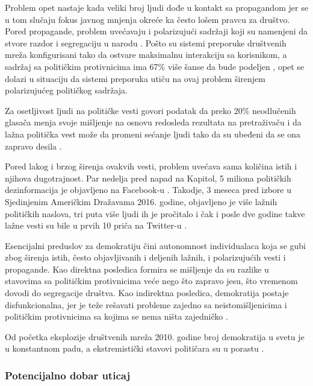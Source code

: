 \documentclass[a4paper]{article}
\begin{document}
Problem opet nastaje kada veliki broj ljudi dođe u kontakt sa propagandom jer se u tom slučaju fokus javnog mnjenja okreće ka često lošem pravcu za društvo. Pored propagande, problem uvećavaju i polarizujući sadržaji koji su namenjeni da stvore razdor i segregaciju u narodu \cite{Ledger_of_Harms}. Pošto su sistemi preporuke društvenih mreža konfigurisani tako da ostvare maksimalnu interakciju sa korisnikom, a sadržaj sa političkim protivnicima ima 67\% više šanse da bude podeljen \cite{Rathje_Van_Bavel_van_der_Linden_2021}, opet se dolazi u situaciju da sistemi preporuka utiču na ovaj problem širenjem polarizujućeg političkog sadržaja.

Za osetljivost ljudi na političke vesti govori podatak da preko 20\% neodlučenih glasača menja svoje mišljenje na osnovu redosleda rezultata na pretraživaču \cite{Epstein_Robertson_2015} i da lažna politička vest može da promeni sećanje ljudi tako da su ubeđeni da se ona zapravo desila \cite{Murphy_Loftus_Grady_Levine_Greene_2019}.

Pored lakog i brzog širenja ovakvih vesti, problem uvećava sama količina istih i njihova dugotrajnost. Par nedelja pred napad na Kapitol, 5 miliona političkih dezinformacija je objavljeno na Facebook-u \cite{Mac_Silverman_2020}. Takodje, 3 meseca pred izbore u Sjedinjenim Američkim Dražavama 2016. godine, objavljeno je više lažnih političkih naslova, tri puta više ljudi ih je pročitalo i čak i posle dve godine takve lažne vesti su bile u prvih 10 priča na Twitter-u \cite{Silverman_2016} \cite{Knight_Foundation}.

Esencijalni preduslov za demokratiju čini autonomnost individualaca \cite{Genovesi_Kaesling_Robbins_2023} koja se gubi zbog širenja istih, često objavljivanih i deljenih lažnih, i polarizujućih vesti i propagande. Kao direktna posledica formira se mišljenje da su razlike u stavovima sa političkim protivnicima veće nego što zapravo jesu, što vremenom dovodi do segregacije društva. Kao indirektna posledica, demokratija postaje disfunkcionalna, jer je teže rešavati probleme zajedno sa neistomišljenicima i političkim protivnicima sa kojima se nema ništa zajedničko \cite{Center_for_Humane_Technology}.

Od početka eksplozije društvenih mreža 2010. godine broj demokratija u svetu je u konstantnom padu, a ekstremistički stavovi političara su u porastu \cite{Center_for_Humane_Technology}.


\subsubsection{Potencijalno dobar uticaj}
\label{subsec: potencijal_demokratija 2}
\end{document}
